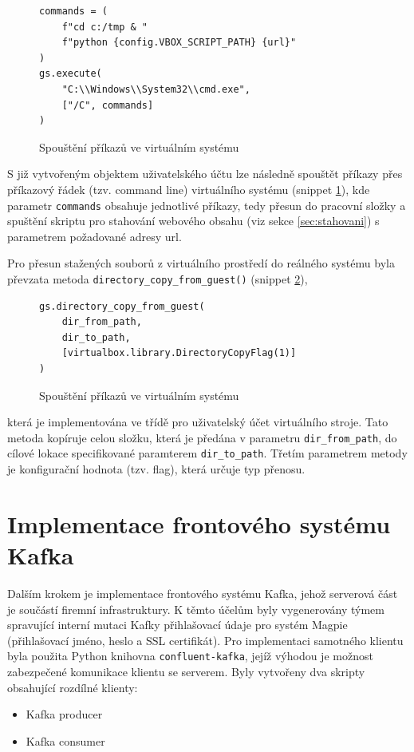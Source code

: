 \documentclass[thesis=M,czech,hidelinks]{FITthesis}[2013/05/06]
\begin{document}
\begin{figure}[h]               
	\begin{verbatim}
commands = (
    f"cd c:/tmp & "
    f"python {config.VBOX_SCRIPT_PATH} {url}"
)
gs.execute(
    "C:\\Windows\\System32\\cmd.exe", 
    ["/C", commands]
)
	\end{verbatim}      
	\caption{Spouštění příkazů ve virtuálním systému}
	\label{snip:vboxcommand}
\end{figure}
S již vytvořeným objektem uživatelského účtu lze následně spouštět příkazy přes příkazový řádek (tzv. command line) virtuálního systému (snippet \ref{snip:vboxcommand}), kde parametr \texttt{commands} obsahuje jednotlivé příkazy, tedy přesun do pracovní složky a spuštění skriptu pro stahování webového obsahu (viz sekce \ref{sec:stahovani}) s parametrem požadované adresy url.

Pro přesun stažených souborů z virtuálního prostředí do reálného systému byla převzata metoda \texttt{directory_copy_from_guest()} (snippet \ref{snip:vboxcopy}),
\begin{figure}[h]               
	\begin{verbatim}
gs.directory_copy_from_guest(
    dir_from_path,
    dir_to_path,
    [virtualbox.library.DirectoryCopyFlag(1)]
)
	\end{verbatim}      
	\caption{Spouštění příkazů ve virtuálním systému}
	\label{snip:vboxcopy}
\end{figure}
 která je implementována ve třídě pro uživatelský účet virtuálního stroje. Tato metoda kopíruje celou složku, která je předána v parametru \texttt{dir_from_path}, do cílové lokace specifikované paramterem \texttt{dir_to_path}. Třetím parametrem metody je konfigurační hodnota (tzv. flag), která určuje typ přenosu.








\section{Implementace frontového systému Kafka}

Dalším krokem je implementace frontového systému Kafka, jehož serverová část je součástí firemní infrastruktury. K těmto účelům byly vygenerovány týmem spravující interní mutaci Kafky přihlašovací údaje pro systém Magpie (přihlašovací jméno, heslo a SSL certifikát). Pro implementaci samotného klientu byla použita Python knihovna \texttt{confluent-kafka}\cite{confluent-kafka}, jejíž výhodou je možnost zabezpečené komunikace klientu se serverem. Byly vytvořeny dva skripty obsahující rozdílné klienty:
\begin{itemize}
	\item Kafka producer
	\item Kafka consumer
\end{itemize}
\end{document}
